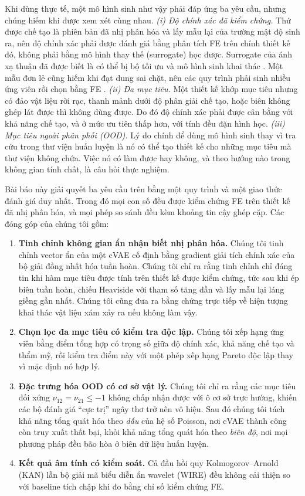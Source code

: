 \documentclass[a4paper,11pt]{article}
\newcommand{\nuot}{\nu_{12}}
\newcommand{\nuto}{\nu_{21}}
\begin{document}
Khi dùng thực tế, một mô hình sinh như vậy phải đáp ứng ba yêu cầu, nhưng
chúng hiếm khi được xem xét cùng nhau.
\emph{(i) Độ chính xác đã kiểm chứng.} Thứ được chế tạo là phiên bản đã nhị
phân hóa và lấy mẫu lại của trường mật độ sinh ra, nên độ chính xác phải
được đánh giá bằng phân tích FE trên chính thiết kế đó, không phải bằng mô
hình thay thế (surrogate) học được. Surrogate của ánh xạ thuận đã được biết
là có thể bị bộ tối ưu và mô hình sinh khai thác \citep{trabucco2021coms}.
Một mẫu đơn lẻ cũng hiếm khi đạt dung sai chặt, nên các quy trình phải sinh
nhiều ứng viên rồi chọn bằng FE \citep{pahlavani2024deep}.
\emph{(ii) Đa mục tiêu.} Một thiết kế khớp mục tiêu nhưng có đảo vật liệu
rời rạc, thanh mảnh dưới độ phân giải chế tạo, hoặc biên không ghép lát được
thì không dùng được. Do đó độ chính xác phải được cân bằng với khả năng chế
tạo, và ở mức ưu tiên thấp hơn, với tính đều đặn hình học.
\emph{(iii) Mục tiêu ngoài phân phối (OOD).} Lý do chính để dùng mô hình sinh
thay vì tra cứu trong thư viện huấn luyện là nó có thể tạo thiết kế cho
những mục tiêu mà thư viện không chứa. Việc nó có làm được hay không, và
theo hướng nào trong không gian tính chất, là câu hỏi thực nghiệm.

Bài báo này giải quyết ba yêu cầu trên bằng một quy trình và một giao thức
đánh giá duy nhất. Trong đó mọi con số đều được kiểm chứng FE trên thiết kế
đã nhị phân hóa, và mọi phép so sánh đều kèm khoảng tin cậy ghép cặp. Các
đóng góp của chúng tôi gồm:
\begin{enumerate}
\item \textbf{Tinh chỉnh không gian ẩn nhận biết nhị phân hóa.} Chúng tôi
tinh chỉnh vector ẩn của một cVAE cố định bằng gradient giải tích chính xác
của bộ giải đồng nhất hóa tuần hoàn. Chúng tôi chỉ ra rằng tinh chỉnh chỉ
đáng tin khi hàm mục tiêu được tính trên thiết kế được kiểm chứng, tức sau
khi ép biên tuần hoàn, chiếu Heaviside với tham số tăng dần
\citep{guest2004achieving,wang2011projection} và lấy mẫu lại láng giềng gần
nhất. Chúng tôi cũng đưa ra bằng chứng trực tiếp về hiện tượng khai thác
vật liệu xám xảy ra nếu không làm vậy.
\item \textbf{Chọn lọc đa mục tiêu có kiểm tra độc lập.} Chúng tôi xếp hạng
ứng viên bằng điểm tổng hợp có trọng số giữa độ chính xác, khả năng chế tạo
và thẩm mỹ, rồi kiểm tra điểm này với một phép xếp hạng Pareto độc lập thay
vì mặc định nó hợp lý.
\item \textbf{Đặc trưng hóa OOD có cơ sở vật lý.} Chúng tôi chỉ ra rằng các
mục tiêu đối xứng $\nuot=\nuto\le-1$ không chấp nhận được với ô cơ sở trực
hướng, khiến các bộ đánh giá ``cực trị'' ngây thơ trở nên vô hiệu. Sau đó
chúng tôi tách khả năng tổng quát hóa theo \emph{dấu} của hệ số Poisson, nơi
cVAE thành công còn truy xuất thất bại, khỏi khả năng tổng quát hóa theo
\emph{biên độ}, nơi mọi phương pháp đều bão hòa ở biên dữ liệu huấn luyện.
\item \textbf{Kết quả âm tính có kiểm soát.} Cả đầu hồi quy
Kolmogorov--Arnold (KAN) lẫn bộ giải mã biểu diễn ẩn wavelet (WIRE) đều
không cải thiện so với baseline tích chập khi đo bằng chỉ số kiểm chứng FE.
\end{enumerate}
\end{document}
